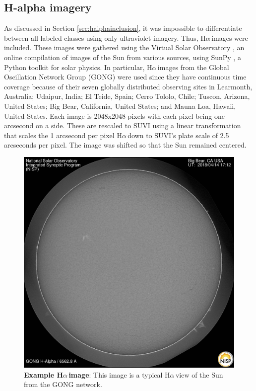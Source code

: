 \documentclass[twoside]{report}
\newcommand{\halpha}{H$\alpha$\,}
\begin{document}
\subsection{H-alpha imagery} 
As discussed in Section \ref{sec:halphainclusion}, it was impossible to differentiate between all labeled classes using only ultraviolet imagery. Thus, \halpha images were included. These images were gathered using the Virtual Solar Observatory \cite{vso}, an online compilation of images of the Sun from various sources, using SunPy \cite{sunpy, sunpyweb}, a Python toolkit for solar physics. In particular, \halpha images from the Global Oscillation Network Group (GONG) were used since they have continuous time coverage because of their seven globally distributed observing sites in Learmonth, Australia; Udaipur, India; El Teide, Spain; Cerro Tololo, Chile; Tuscon, Arizona, United States; Big Bear, California, United States; and Mauna Loa, Hawaii, United States. Each image is 2048x2048 pixels with each pixel being one arcsecond on a side. These are rescaled to SUVI using a linear transformation that scales the 1 arcsecond per pixel \halpha down to SUVI's plate scale of 2.5 arcseconds per pixel. The image was shifted so that the Sun remained centered.

\begin{figure}[ht]
  \begin{center}
    \includegraphics[scale=0.1]{example-halpha.jpg}
    \caption{{\bf Example \halpha image}: This image is a typical \halpha view of the Sun from the GONG network.}
    \label{fig:halphaimage}
 \end{center}
\end{figure}
\end{document}
